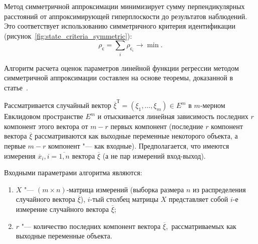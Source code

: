 Метод симметричной аппроксимации минимизирует сумму перпендикулярных расстояний
от аппроксимирующей гиперплоскости до результатов наблюдений.
Это соответствует использованию симметричного критерия идентификации
(рисунок~\ref{fig:state_criteria_symmetric}):
\begin{equation*}
  \rho_{\text{с}} = \sum_i \rho_{\text{с}_i} \rightarrow \min.
\end{equation*}

Алгоритм расчета оценок параметров линейной функции регрессии
методом симметричной аппроксимации составлен на основе теоремы, доказанной в статье~\cite{mukha_2016}.

Рассматривается случайный вектор \( \overline{\xi}^{\text{Т}} = (\xi_1, \ldots, \xi_m ) \in E^m \)
в \( m \)-мерном Евклидовом пространстве \( E^m \) и отыскивается линейная
зависимость последних \( r \) компонент этого вектора от \( m - r \) первых компонент
(последние \( r \) компонент вектора \( \overline{\xi} \) рассматриваются как выходные
переменные некоторого объекта, а первые \( m - r \) компонент "--- как входные).
Предполагается, что имеются измерения \( \overline{x}_i, i = \overline{1, n} \)
вектора \( \overline{\xi} \) (а не пар измерений вход-выход).

Входными параметрами алгоритма являются:
\begin{enumerate}
\item \( X \) "--- \( (m \times n) \)-матрица измерений
  (выборка размера \( n \) из распределения случайного вектора \( \overline{\xi} \)),
  \( i \)-тый столбец матрицы \( X \) представляет собой \( i \)-е измерение случайного
  вектора \( \overline{\xi} \);
\item \( r \) "--- количество последних компонент вектора \( \overline{\xi} \),\
  рассматриваемых как выходные переменные объекта.
\end{enumerate}

